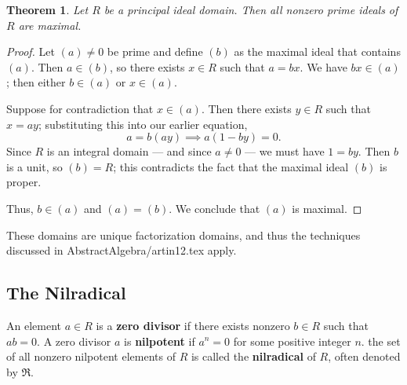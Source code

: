 \documentclass[11pt]{article}
\newtheorem{theorem}{Theorem}
\begin{document}
\begin{adjustwidth}{0.5cm}{}
	\begin{theorem}
		Let $R$ be a principal ideal domain. Then all nonzero prime ideals of $R$ are maximal.
	\end{theorem}
	\begin{proof}
		Let $(a) \ne 0$ be prime and define $(b)$ as the maximal ideal that contains $(a)$. Then $a \in (b)$, so there exists $x \in R$ such that $a = bx$. We have $bx \in (a)$; then either $b \in (a)$ or $x \in (a)$.
		
		Suppose for contradiction that $x \in (a)$. Then there exists $y \in R$ such that $x = ay$; substituting this into our earlier equation,
		\[
			a = b(ay) \implies a(1 - by) = 0.
		\]
		Since $R$ is an integral domain --- and since $a \ne 0$ --- we must have $1 = by$. Then $b$ is a unit, so $(b) = R$; this contradicts the fact that the maximal ideal $(b)$ is proper.

		Thus, $b \in (a)$ and $(a) = (b)$. We conclude that $(a)$ is maximal.
	\end{proof}
\end{adjustwidth}

These domains are unique factorization domains, and thus the techniques discussed in AbstractAlgebra/artin12.tex apply.


\subsection{The Nilradical}

An element $a \in R$ is a \textbf{zero divisor} if there exists nonzero $b \in R$ such that $ab = 0$. A zero divisor $a$ is \textbf{nilpotent} if $a^{n} = 0$ for some positive integer $n$. the set of all nonzero nilpotent elements of $R$ is called the \textbf{nilradical} of $R$, often denoted by $\mathfrak{R}$.
\end{document}
